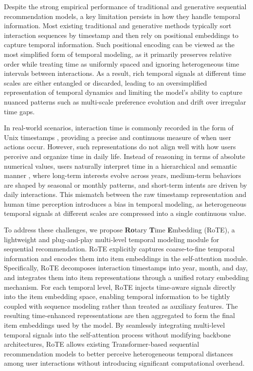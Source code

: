 \documentclass[sigconf,natbib=true]{acmart}
\begin{document}
Despite the strong empirical performance of traditional and generative sequential recommendation models, a key limitation \cite{nasir2023survey} persists in how they handle temporal information. Most existing traditional and generative methods typically sort interaction sequences by timestamp and then rely on positional embeddings to capture temporal information. Such positional encoding \cite{lopez2024positional} can be viewed as the most simplified form of temporal modeling, as it primarily preserves relative order while treating time as uniformly spaced and ignoring heterogeneous time intervals between interactions. As a result, rich temporal signals at different time scales are either entangled or discarded, leading to an oversimplified representation of temporal dynamics and limiting the model’s ability to capture nuanced patterns such as multi-scale preference evolution and drift over irregular time gaps.

In real-world scenarios, interaction time is commonly recorded in the form of Unix timestamps \cite{hauser2018unix}, providing a precise and continuous measure of when user actions occur. However, such representations do not align well with how users perceive and organize time in daily life. Instead of reasoning in terms of absolute numerical values, users naturally interpret time in a hierarchical and semantic manner \cite{poppel1997hierarchical}, where long-term interests evolve across years, medium-term behaviors are shaped by seasonal or monthly patterns, and short-term intents are driven by daily interactions. This mismatch between the raw timestamp representation and human time perception introduces a bias in temporal modeling, as heterogeneous temporal signals at different scales are compressed into a single continuous value. 

To address these challenges, we propose \textbf{Ro}tary \textbf{T}ime \textbf{E}mbedding (RoTE), a lightweight and plug-and-play multi-level temporal modeling module for sequential recommendation. RoTE explicitly captures coarse-to-fine temporal information and encodes them into item embeddings in the self-attention module. Specifically, RoTE decomposes interaction timestamps into year, month, and day, and integrates them into item representations through a unified rotary embedding mechanism. For each temporal level, RoTE injects time-aware signals directly into the item embedding space, enabling temporal information to be tightly coupled with sequence modeling rather than treated as auxiliary features. The resulting time-enhanced representations are then aggregated to form the final item embeddings used by the model. By seamlessly integrating multi-level temporal signals into the self-attention process without modifying backbone architectures, RoTE allows existing Transformer-based sequential recommendation models to better perceive heterogeneous temporal distances among user interactions without introducing significant computational overhead.
\end{document}
